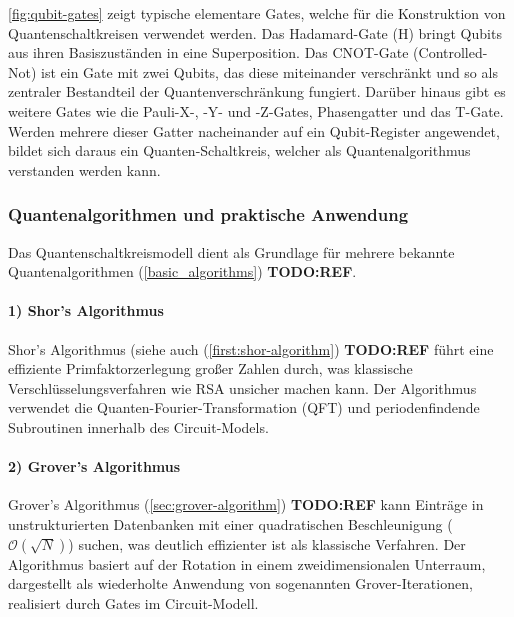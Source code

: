 \autoref{fig:qubit-gates} zeigt typische elementare Gates, welche für die Konstruktion von Quantenschaltkreisen verwendet werden. Das Hadamard-Gate (H) bringt Qubits aus ihren Basiszuständen in eine Superposition. Das CNOT-Gate (Controlled-Not) ist ein Gate mit zwei Qubits, das diese miteinander verschränkt und so als zentraler Bestandteil der Quantenverschränkung fungiert. Darüber hinaus gibt es weitere Gates wie die Pauli-X-, -Y- und -Z-Gates, Phasengatter und das T-Gate. Werden mehrere dieser Gatter nacheinander auf ein Qubit-Register angewendet, bildet sich daraus ein Quanten-Schaltkreis, welcher als Quantenalgorithmus verstanden werden kann. \autocite[174-188]{nielsen_quantum_2010}

\subsubsection*{Quantenalgorithmen und praktische Anwendung}

Das Quantenschaltkreismodell dient als Grundlage für mehrere bekannte Quantenalgorithmen (\autoref{basic_algorithms}) \textbf{TODO:REF}.
\\

\paragraph{1) Shor's Algorithmus}
Shor's Algorithmus (siehe auch (\autoref{first:shor-algorithm}) \textbf{TODO:REF} führt eine effiziente Primfaktorzerlegung großer Zahlen durch, was klassische Verschlüsselungsverfahren wie RSA unsicher machen kann. Der Algorithmus verwendet die Quanten-Fourier-Transformation (QFT) und periodenfindende Subroutinen innerhalb des Circuit-Models. \autocite[226-232]{nielsen_quantum_2010} \autocite{haywardQuantumComputingShors2005}
\\

\paragraph{2) Grover's Algorithmus}
Grover's Algorithmus (\autoref{sec:grover-algorithm}) \textbf{TODO:REF} kann Einträge in unstrukturierten Datenbanken mit einer quadratischen Beschleunigung (\( \mathcal{O}(\sqrt{N}) \)) suchen, was deutlich effizienter ist als klassische Verfahren. Der Algorithmus basiert auf der Rotation in einem zweidimensionalen Unterraum, dargestellt als wiederholte Anwendung von sogenannten Grover-Iterationen, realisiert durch Gates im Circuit-Modell. \autocite[248-254]{nielsen_quantum_2010}
\\

